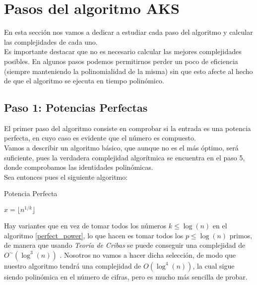 \section{Pasos del algoritmo AKS}

En esta sección nos vamos a dedicar a estudiar cada paso del algoritmo y calcular las complejidades de cada uno.\\

Es importante destacar que no es necesario calcular las mejores complejidades posibles. En algunos pasos podemos permitirnos perder un poco de eficiencia (siempre manteniendo la polinomialidad de la misma) sin que esto afecte al hecho de que el algoritmo se ejecuta en tiempo polinómico.

\subsection{Paso 1: Potencias Perfectas}

El primer paso del algoritmo consiste en comprobar si la entrada es una potencia perfecta, en cuyo caso es evidente que el número es compuesto.\\

Vamos a describir un algoritmo básico, que aunque no es el más óptimo, será suficiente, pues la verdadera complejidad algorítmica se encuentra en el paso 5, donde comprobamos las identidades polinómicas.\\

Sea entonces pues el siguiente algoritmo:

\begin{algorithm}
	\caption{Potencia Perfecta}\label{perfect_power}
	\begin{algorithmic}[1]
				\State $x = \lfloor n^{1/k} \rfloor$
					\State {}
				\EndIf
			\EndFor
			\State {}
		\EndProcedure
	\end{algorithmic}
\end{algorithm}

Hay variantes que en vez de tomar todos los números $k \leq \log(n)$ en el algoritmo \ref{perfect_power}, lo que hacen es tomar todos los $p \leq \log(n)$ primos, de manera que usando \textit{Teoría de Cribas} se puede conseguir una complejidad de $O^\sim(\log^3(n))$ \cite{bach_sorenson_1989}. Nosotros no vamos a hacer dicha selección, de modo que nuestro algoritmo tendrá una complejidad de $O(\log^4(n))$, la cual sigue siendo polinómica en el número de cifras, pero es mucho más sencilla de probar.\\

